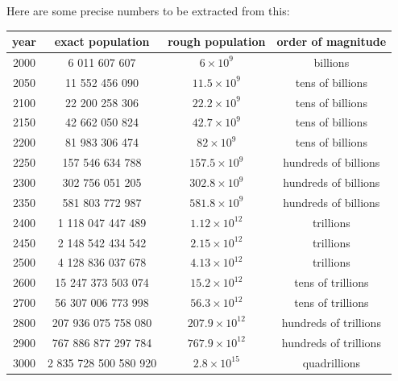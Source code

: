 \documentclass[a4paper]{article}
\begin{document}
		\bigskip
		
		Here are some precise numbers to be extracted from this:
		
	\begin{center}		
		\begin{tabular}{c | c | c | c }
			year & exact population & rough population & order of magnitude \\\hline
			2000 & 6 011 607 607 & $6\times10^9$ & billions \\\hline
			2050 & 11 552 456 090 & $11.5\times10^9$ & tens of billions \\\hline
			2100 & 22 200 258 306 & $22.2\times10^9$ & tens of billions \\\hline
			2150 & 42 662 050 824 & $42.7\times10^9$ & tens of billions \\\hline
			2200 & 81 983 306 474 & $82\times10^9$ & tens of billions \\\hline
			2250 & 157 546 634 788 & $157.5\times10^9$ & hundreds of billions \\\hline
			2300 & 302 756 051 205 & $302.8\times10^9$ & hundreds of billions \\\hline
			2350 & 581 803 772 987 & $581.8\times10^9$ & hundreds of billions \\\hline
			2400 & 1 118 047 447 489 & $1.12\times10^{12}$ & trillions \\\hline
			2450 & 2 148 542 434 542 & $2.15\times10^{12}$ & trillions \\\hline
			2500 & 4 128 836 037 678 & $4.13\times10^{12}$ & trillions \\\hline
			2600 & 15 247 373 503 074 & $15.2\times10^{12}$ & tens of trillions \\\hline
			2700 & 56 307 006 773 998 & $56.3\times10^{12}$ & tens of trillions \\\hline
			2800 & 207 936 075 758 080 & $207.9\times10^{12}$ & hundreds of trillions \\\hline
			2900 & 767 886 877 297 784 & $767.9\times10^{12}$ & hundreds of trillions \\\hline
			3000 & 2 835 728 500 580 920 & $2.8\times10^{15}$ & quadrillions \\
		\end{tabular}
	\end{center}
	
	\pagebreak
	
	\small
	
\end{document}
